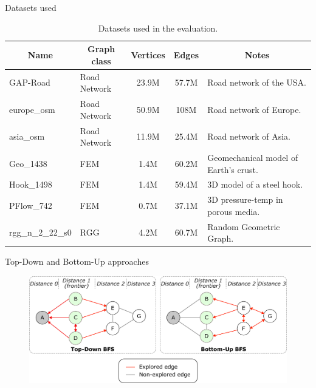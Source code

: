 \begin{specialframe}{Datasets used}
\scriptsize
\begin{table}[h]
    \centering
    \begin{tabularx}{\linewidth}{ l l c c l }
    \toprule
    \multicolumn{1}{c}{\textbf{Name}} & \multicolumn{1}{c}{\textbf{Graph class}} & \multicolumn{1}{c}{\textbf{Vertices}} &
    \multicolumn{1}{c}{\textbf{Edges}} & 
    \multicolumn{1}{c}{\textbf{Notes}}\\
    \midrule
    GAP-Road      & Road Network & 23.9M & 57.7M & Road network of the USA. \\
    europe\_osm   & Road Network & 50.9M & 108M  & Road network of Europe. \\
    asia\_osm     & Road Network & 11.9M & 25.4M & Road network of Asia. \\
    \addlinespace %
    Geo\_1438     & FEM          & 1.4M  & 60.2M & Geomechanical model of Earth's crust. \\
    Hook\_1498    & FEM          & 1.4M  & 59.4M & 3D model of a steel hook. \\
    PFlow\_742     & FEM          & 0.7M  & 37.1M & 3D pressure-temp in porous media. \\
    \addlinespace %
    rgg\_n\_2\_22\_s0 & RGG          & 4.2M  & 60.7M & Random Geometric Graph. \\
    \bottomrule
    \end{tabularx}
    \caption{Datasets used in the evaluation.}
    \label{tab:datasets_booktabs}
\end{table}
\end{specialframe}

\begin{specialframe}{Top-Down and Bottom-Up approaches}
\begin{figure}
\centering
\includegraphics[width=0.8\linewidth]{images/hybrid bfs.png}
\end{figure}
\end{specialframe}

